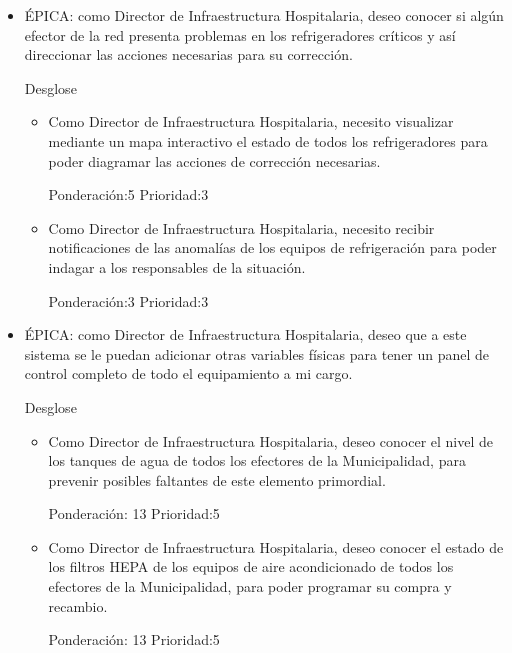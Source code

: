 \documentclass[11pt]{proyecto}
\begin{document}
\begin{itemize}
\item ÉPICA: como Director de Infraestructura Hospitalaria, deseo conocer si algún efector de la red presenta problemas en los refrigeradores críticos y así direccionar las acciones necesarias para su corrección. 

Desglose

	\begin{itemize}
	\item Como Director de Infraestructura Hospitalaria, necesito visualizar mediante un mapa interactivo el estado de todos los refrigeradores para poder diagramar las acciones de corrección necesarias.  

Ponderación:5 Prioridad:3
	\end{itemize}

	\begin{itemize}
	\item Como Director de Infraestructura Hospitalaria, necesito recibir notificaciones de las anomalías de los equipos de refrigeración para poder indagar a los responsables de la situación.  

Ponderación:3 Prioridad:3
	\end{itemize}

\end{itemize}


\begin{itemize}
\item ÉPICA: como Director de Infraestructura Hospitalaria, deseo que a este sistema se le puedan adicionar otras variables físicas para tener un panel de control completo de todo el equipamiento a mi cargo. 

Desglose

	\begin{itemize}
	\item Como Director de Infraestructura Hospitalaria, deseo conocer el nivel de los tanques de agua de todos los efectores de la Municipalidad, para prevenir posibles faltantes de este elemento primordial.
	
Ponderación: 13 Prioridad:5
	\end{itemize}

	\begin{itemize}
	\item Como Director de Infraestructura Hospitalaria, deseo conocer el estado de los filtros HEPA de los equipos de aire acondicionado de todos los efectores de la Municipalidad, para poder programar su compra y recambio.
	
Ponderación: 13 Prioridad:5
	\end{itemize}

\end{itemize}
\end{document}
